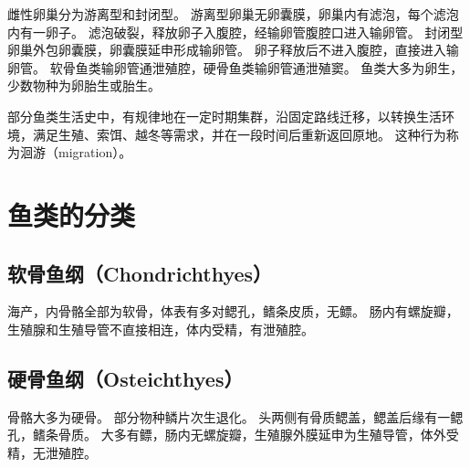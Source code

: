 \documentclass[11pt]{article}
\begin{document}
\newline

雌性卵巢分为游离型和封闭型。
游离型卵巢无卵囊膜，卵巢内有滤泡，每个滤泡内有一卵子。
滤泡破裂，释放卵子入腹腔，经输卵管腹腔口进入输卵管。
封闭型卵巢外包卵囊膜，卵囊膜延申形成输卵管。
卵子释放后不进入腹腔，直接进入输卵管。
软骨鱼类输卵管通泄殖腔，硬骨鱼类输卵管通泄殖窦。
鱼类大多为卵生，少数物种为卵胎生或胎生。

\newline

部分鱼类生活史中，有规律地在一定时期集群，沿固定路线迁移，以转换生活环境，满足生殖、索饵、越冬等需求，并在一段时间后重新返回原地。
这种行为称为洄游（migration）。
  
\section{鱼类的分类}
\subsection{软骨鱼纲（Chondrichthyes）}
海产，内骨骼全部为软骨，体表有多对鳃孔，鳍条皮质，无鳔。
肠内有螺旋瓣，生殖腺和生殖导管不直接相连，体内受精，有泄殖腔。
  
\subsection{硬骨鱼纲（Osteichthyes）}
骨骼大多为硬骨。
部分物种鳞片次生退化。
头两侧有骨质鳃盖，鳃盖后缘有一鳃孔，鳍条骨质。
大多有鳔，肠内无螺旋瓣，生殖腺外膜延申为生殖导管，体外受精，无泄殖腔。
\end{document}
